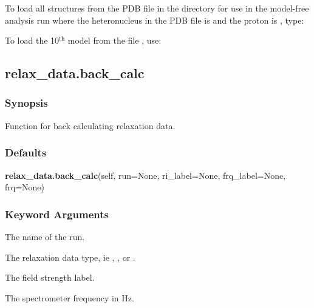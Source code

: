 To load all structures from the PDB  file 
 in the directory 
 for use in the
model-free analysis run 
 where the heteronucleus in the PDB  file is 
 and the proton
is 
, type:





To load the 10$^\mathrm{th}$ model from the file 
, use:





\newpage

\subsection{relax\_data.back\_calc}


\subsubsection{Synopsis}

Function for back calculating relaxation data.

\subsubsection{Defaults}

\textsf{\textbf{relax\_data.back\_calc}(self, run=None, ri\_label=None, frq\_label=None, frq=None)}


\subsubsection{Keyword Arguments}


  The name of the run.

  The relaxation  data type, ie 
, 
, or 
.

  The field strength label.

  The spectrometer frequency in Hz.


